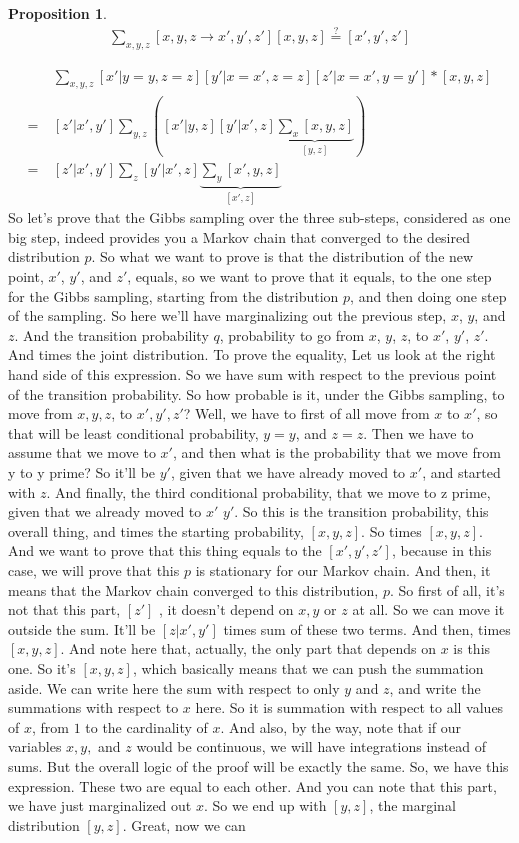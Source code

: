 \documentclass[11pt, oneside, reqno]{amsart}
\numberwithin{equation}{section}
\theoremstyle{plain}%
\newtheorem{prop}[thm]{Proposition}
\theoremstyle{definition}
\theoremstyle{remark}
\begin{document}
\begin{prop}
\begin{align*}
	\sum_{x,y,z} [x,y,z\to x',y',z'][x,y,z]\stackrel{?}{=} [x',y',z']
\end{align*}
\end{prop}
\begin{align*}
&\	\sum_{x,y,z}[x'|y=y,z=z][y'|x=x',z=z][z'|x=x',y=y']*[x,y,z]\\
= &\ [z'|x',y']\sum_{y,z}([x'|y,z][y'|x',z]\underbrace{\sum_x [x,y,z]}_{[y,z]})\\
= &\ [z'|x',y']\sum_z[y'|x',z]\underbrace{\sum_y[x',y,z]}_{[x',z]}
\end{align*}
So let's prove that the Gibbs sampling over the three sub-steps, considered as one big step, indeed provides you a Markov chain that converged to the desired distribution $p$.
So what we want to prove is that the distribution of the new point, $x'$, $y'$, and $z'$, equals, so we want to prove that it equals, to the one step for the Gibbs sampling, starting from the distribution $p$, and then doing one step of the sampling. So here we'll have marginalizing out the previous step, $x$, $y$, and $z$. And the transition probability $q$, probability to go from $x$, $y$, $z$, to $x'$, $y'$, $z'$. And times the joint distribution. To prove the equality, Let us look at the right hand side of this expression. So we have sum with respect to the previous point of the transition probability. So how probable is it, under the Gibbs sampling, to move from $x, y, z$, to $x', y', z'$? Well, we have to first of all move from $x$ to $x'$, so that will be least conditional probability, $y = y$, and $z = z$. Then we have to assume that we move to $x'$, and then what is the probability that we move from y to y prime? So it'll be $y'$, given that we have already moved to $x'$, and started with $z$. And finally, the third conditional probability, that we move to z prime, given that we already moved to $x'$ $y'$. So this is the transition probability, this overall thing, and times the starting probability, $[x, y, z]$. So times $[x, y, z]$. And we want to prove that this thing equals to the $[x',y',z']$, because in this case, we will prove that this $p$ is stationary for our Markov chain. And then, it means that the Markov chain converged to this distribution, $p$. So first of all, it's not that this part, $[z']$ , it doesn't depend on $x, y$ or $z$ at all. So we can move it outside the sum. It'll be $[z|x',y']$ times sum of these two terms. And then, times $[x,y,z]$. And note here that, actually, the only part that depends on $x$ is this one. So it's $[x, y, z]$, which basically means that we can push the summation aside. We can write here the sum with respect to only $y$ and $z$, and write the summations with respect to $x$ here. So it is summation with respect to all values of $x$, from $1$ to the cardinality of $x$. And also, by the way, note that if our variables $x, y,$ and $z$ would be continuous, we will have integrations instead of sums. But the overall logic of the proof will be exactly the same. So, we have this expression. These two are equal to each other. And you can note that this part, we have just marginalized out $x$. So we end up with $[y, z]$, the marginal distribution $[y, z]$. Great, now we can 
\end{document}
